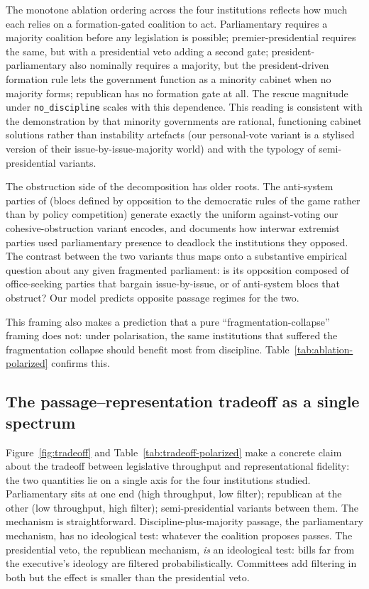 \documentclass[11pt]{article}
\begin{document}
The monotone ablation ordering across the four institutions reflects how
much each relies on a formation-gated coalition to act. Parliamentary requires a
majority coalition before any legislation is possible; premier-presidential
requires the same, but with a presidential veto adding a second gate;
president-parliamentary also nominally requires a majority, but the
president-driven formation rule lets the government function as a minority
cabinet when no majority forms; republican has no formation gate at all.
The rescue magnitude under \texttt{no\_discipline} scales with this
dependence. This reading is consistent with the demonstration by
\citet{strom1984, strom1990} that minority governments are rational, functioning cabinet
solutions rather than instability artefacts (our personal-vote variant is a
stylised version of their issue-by-issue-majority world) and with
the \citet{shugart1992} typology of semi-presidential variants.

The obstruction side of the decomposition has older roots.
The anti-system parties of \citet{sartori1976} (blocs defined by opposition to
the democratic rules of the game rather than by policy competition)
generate exactly the uniform against-voting our cohesive-obstruction variant
encodes, and \citet{capoccia2005} documents how interwar extremist parties
used parliamentary presence to deadlock the institutions they opposed. The
contrast between the two variants thus maps onto a substantive empirical
question about any given fragmented parliament: is its opposition composed
of office-seeking parties that bargain issue-by-issue, or of anti-system
blocs that obstruct? Our model predicts opposite passage regimes for the two.

This framing also makes a prediction that a pure
``fragmentation-collapse'' framing does not: under polarisation, the same
institutions that suffered the fragmentation collapse should benefit most
from discipline. Table~\ref{tab:ablation-polarized} confirms this.

\subsection{The passage--representation tradeoff as a single spectrum}

Figure~\ref{fig:tradeoff} and Table~\ref{tab:tradeoff-polarized} make a
concrete claim about the tradeoff between legislative throughput and
representational fidelity: the two quantities lie on a single axis for the
four institutions studied. Parliamentary sits at one end (high throughput,
low filter); republican at the other (low throughput, high filter);
semi-presidential variants between them. The mechanism is
straightforward. Discipline-plus-majority passage, the parliamentary
mechanism, has no ideological test: whatever the coalition proposes
passes. The presidential veto, the republican mechanism, \emph{is} an
ideological test: bills far from the executive's ideology are filtered
probabilistically. Committees add filtering in both but the effect is
smaller than the presidential veto.
\end{document}
